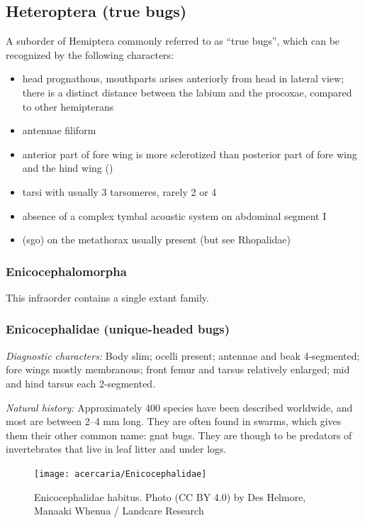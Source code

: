 \subsection{Heteroptera (true bugs)}
A suborder of Hemiptera commonly referred to as ``true bugs'', which can be recognized by the following characters:
\begin{itemize}
    \item head prognathous, mouthparts arises anteriorly from head in lateral view; there is a distinct distance between the labium and the procoxae, compared to other hemipterans
    \item antennae filiform
    \item anterior part of fore wing is more sclerotized than posterior part of fore wing and the hind wing ()
    \item tarsi with usually 3 tarsomeres, rarely 2 or 4
    \item absence of a complex tymbal acoustic system on abdominal segment I
    \item {} (sgo) on the metathorax usually present (but see Rhopalidae)
\end{itemize}

\subsubsection{Enicocephalomorpha}
This infraorder contains a single extant family.

\subsubsection{Enicocephalidae (unique-headed bugs)}
\noindent{}\textit{Diagnostic characters:} Body slim; ocelli present; antennae and beak 4-segmented; fore wings mostly membranous; front femur and tarsus relatively enlarged; mid and hind tarsus each 2-segmented.\vspace{3mm}

\noindent{}\textit{Natural history:} Approximately 400 species have been described worldwide, and most are between 2--4 mm long. They are often found in swarms, which gives them their other common name: gnat bugs. They are though to be predators of invertebrates that live in leaf litter and under logs.\vspace{3mm}

\begin{figure}[ht!]
 \centering
 \texttt{[image: acercaria/Enicocephalidae]}
 \caption{Enicocephalidae habitus. Photo (CC BY 4.0) by Des Helmore, Manaaki Whenua / Landcare Research}
 \label{fig:enicocephalid}
\end{figure}

